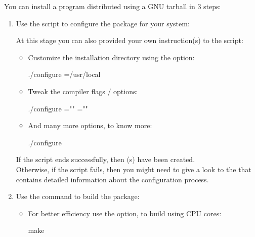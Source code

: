 You can install a program distributed using a GNU tarball in 3 steps:
\vspace{0.25cm}
\begin{enumerate}
\item Use the  script to configure the package for your system:
{\footnotesize{
\begin{scripti}
 
\end{scripti}
}}
At this stage you can also provided your own instruction(s) to the  script:
\begin{itemize}
\item Customize the installation directory using the  option:
{\footnotesize{
\begin{scriptii}
 ./configure =/usr/local
\end{scriptii}
}}
\item Tweak the compiler flags / options:
{\footnotesize{
\begin{scriptii}
 ./configure ="" =""
\end{scriptii}
}}
\item And many more options, to know more: 
{\footnotesize{
\begin{scriptii}
 ./configure 
\end{scriptii}
}}
\end{itemize}
\vspace{-0.75cm}
If the  script ends successfully, then (s) have been created.
\\Otherwise, if the script fails, then you might need to give a look to the  that contains detailed information about the configuration process. 
\item Use the  command to build the package: 
{\footnotesize{
\begin{scripti}
 
\end{scripti}
}}
\vspace{-0.75cm}
\begin{itemize}
\item For better efficiency use the   option, to build using  CPU cores:
{\footnotesize{
\begin{scriptii}
 make  
\end{scriptii}
}}
\end{itemize}
\end{enumerate}
